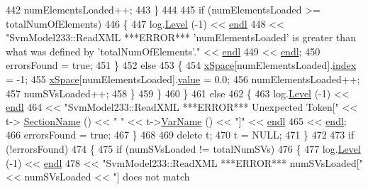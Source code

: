 \begin{DoxyCode}
442           numElementsLoaded++;
443         \}
444 
445         \textcolor{keywordflow}{if}  (numElementsLoaded >= totalNumOfElements)
446         \{
447           log.\hyperlink{class_k_k_b_1_1_run_log_a32cf761d7f2e747465fd80533fdbb659}{Level} (-1) << \hyperlink{namespace_k_k_b_ad1f50f65af6adc8fa9e6f62d007818a8}{endl}
448                << \textcolor{stringliteral}{"SvmModel233::ReadXML   ***ERROR***   'numElementsLoaded'  is greater than what was
       defined by 'totalNumOfElements'."} << \hyperlink{namespace_k_k_b_ad1f50f65af6adc8fa9e6f62d007818a8}{endl}
449                << \hyperlink{namespace_k_k_b_ad1f50f65af6adc8fa9e6f62d007818a8}{endl};
450           errorsFound = \textcolor{keyword}{true};
451         \}
452         \textcolor{keywordflow}{else}
453         \{
454           \hyperlink{struct_s_v_m233_1_1_svm_model233_aec965ac6b8e424d39f043a20a6a9b0ed}{xSpace}[numElementsLoaded].\hyperlink{struct_s_v_m233_1_1svm__node_a3c4e097d4f2ba8091128a9b605fcaa12}{index} = -1;
455           \hyperlink{struct_s_v_m233_1_1_svm_model233_aec965ac6b8e424d39f043a20a6a9b0ed}{xSpace}[numElementsLoaded].\hyperlink{struct_s_v_m233_1_1svm__node_abc3f1df2ce88e0759c7f3fe74eefcf0d}{value} = 0.0;
456           numElementsLoaded++;
457           numSVsLoaded++;
458         \}
459       \}
460     \}
461     \textcolor{keywordflow}{else}
462     \{
463       log.\hyperlink{class_k_k_b_1_1_run_log_a32cf761d7f2e747465fd80533fdbb659}{Level} (-1) << \hyperlink{namespace_k_k_b_ad1f50f65af6adc8fa9e6f62d007818a8}{endl}
464         << \textcolor{stringliteral}{"SvmModel233::ReadXML   ***ERROR***  Unexpected Token["} << t->
      \hyperlink{class_k_k_b_1_1_xml_token_a20aa05209eeafb58c1c595c15f07d504}{SectionName} () << \textcolor{stringliteral}{"  "} << t->\hyperlink{class_k_k_b_1_1_xml_token_a28b39cfdfa2ed63048a812b1cb52263c}{VarName} () << \textcolor{stringliteral}{"]"} << \hyperlink{namespace_k_k_b_ad1f50f65af6adc8fa9e6f62d007818a8}{endl}
465         << \hyperlink{namespace_k_k_b_ad1f50f65af6adc8fa9e6f62d007818a8}{endl};
466       errorsFound = \textcolor{keyword}{true};
467     \}
468 
469     \textcolor{keyword}{delete}  t;
470     t = NULL;
471   \}
472 
473   \textcolor{keywordflow}{if}  (!errorsFound)
474   \{
475     \textcolor{keywordflow}{if}  (numSVsLoaded != totalNumSVs)
476     \{
477       log.\hyperlink{class_k_k_b_1_1_run_log_a32cf761d7f2e747465fd80533fdbb659}{Level} (-1) << \hyperlink{namespace_k_k_b_ad1f50f65af6adc8fa9e6f62d007818a8}{endl}
478         << \textcolor{stringliteral}{"SvmModel233::ReadXML   ***ERROR***   numSVsLoaded["} << numSVsLoaded << \textcolor{stringliteral}{"] does not match
}
\end{DoxyCode}
